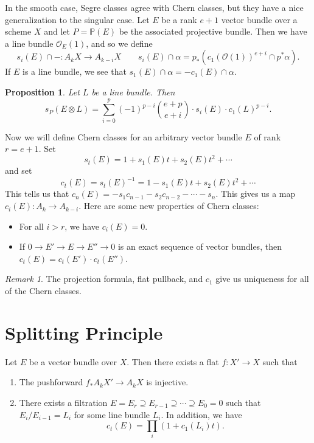 \documentclass[leqno, openany]{memoir}
\newtheorem{prop}[thm]{Proposition}
\theoremstyle{definition}
\theoremstyle{remark}
\newtheorem{rmk}[thm]{Remark}
\theoremstyle{plain}
\theoremstyle{definition}
\theoremstyle{remark}
\renewcommand{\P}{\mathbb{P}}
\newcommand{\mc}[1]{\mathcal{#1}}
\begin{document}
In the smooth case, Segre classes agree with Chern classes, but they have a
nice generalization to the singular case. Let $E$ be a rank $e+1$ vector bundle
over a scheme $X$ and let $P = \P(E)$ be the associated projective bundle. Then
we have a line bundle $\mc{O}_E(1)$, and so we define \[ s_i(E) \cap - \colon
A_k X \to A_{k-i} X \qquad s_i(E) \cap \alpha = p_* (c_1 { (\mc{O}(1)) }^{e+i}
\cap p^* \alpha ). \] If $E$ is a line bundle, we see that $s_1(E) \cap \alpha
= - c_1(E) \cap \alpha$. 

\begin{prop} Let $L$ be a line bundle. Then \[ s_P(E \otimes L) = \sum_{i=0}^p
{(-1)}^{p-i} \binom{e+p}{e+i} \cdot s_i(E) \cdot {c_1(L)}^{p-i}. \] \end{prop}

Now we will define Chern classes for an arbitrary vector bundle $E$ of rank $r
= e+1$. Set \[ s_t(E) = 1 + s_1(E) t + s_2(E) t^2 + \cdots \] and set \[ c_t(E)
= { s_t(E) }^{-1} = 1 - s_1(E) t + s_2(E) t^2 + \cdots \] This tells us that
$c_n(E) = - s_1 c_{n-1} - s_2 c_{n-2} - \cdots - s_n$. This gives us a map
$c_i(E) \colon A_k \to A_{k-i}$. Here are some new properties of Chern classes:
\begin{itemize} \item For all $i > r$, we have $c_i(E) = 0$.  \item If $0 \to
    E' \to E \to E'' \to 0$ is an exact sequence of vector bundles, then
    $c_t(E) = c_t(E') \cdot c_t(E'')$.  \end{itemize}

\begin{rmk} The projection formula, flat pullback, and $c_1$ give us uniqueness
for all of the Chern classes.  \end{rmk}

\section{Splitting Principle}%

Let $E$ be a vector bundle over $X$. Then there exists a flat $f \colon X' \to
X$ such that \begin{enumerate} \item The pushforward $f_* A_k X' \to A_k X$ is
    injective.  \item There exists a filtration $E = E_r \supseteq E_{r-1}
    \supseteq \cdots \supseteq E_0 = 0$ such that $E_i / E_{i-1} = L_i$ for
    some line bundle $L_i$. In addition, we have \[ c_t(E) = \prod_i (1 +
c_1(L_i) t). \] \end{enumerate}
\end{document}
